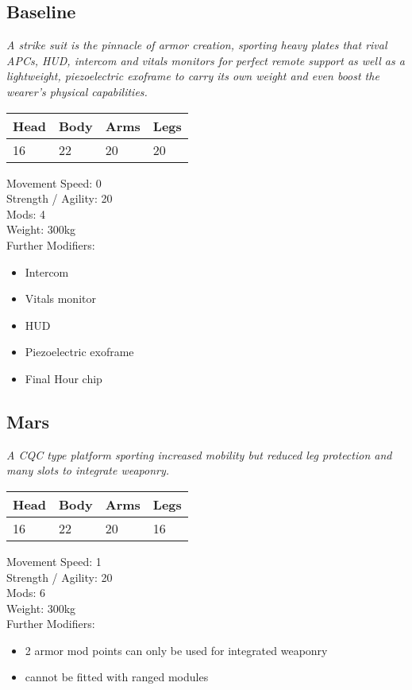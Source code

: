 \documentclass[12pt,a4paper,openany]{book}
\begin{document}
	\begin{multicols}{2}
	\subsection{Baseline}
	\textit{A strike suit is the pinnacle of armor creation, sporting heavy plates that rival APCs, HUD, intercom and vitals monitors for perfect remote support as well as a lightweight, piezoelectric exoframe to carry its own weight and even boost the wearer's physical capabilities.}\par
	\begin{tabular}{|l|l|l|l|}
		\hline
		Head & Body & Arms & Legs\\
		\hline
		16 & 22 & 20 & 20\\
		\hline
	\end{tabular}
	\par
	Movement Speed: 0\\
	Strength / Agility: 20\\
	Mods: 4\\
	Weight: 300kg\\
	Further Modifiers:
	\vspace{-8mm}
	\begin{itemize}
		\setlength\itemsep{-8mm}
		\item Intercom
		\item Vitals monitor
		\item HUD
		\item Piezoelectric exoframe
		\item Final Hour chip
	\end{itemize}
	\par
	\subsection{Mars}
	\textit{A CQC type platform sporting increased mobility but reduced leg protection and many slots to integrate weaponry.}\par
	\begin{tabular}{|l|l|l|l|}
		\hline
		Head & Body & Arms & Legs\\
		\hline
		16 & 22 & 20 & 16\\
		\hline
	\end{tabular}
	\par
	Movement Speed: 1\\
	Strength / Agility: 20\\
	Mods: 6\\
	Weight: 300kg\\
	Further Modifiers:
	\vspace{-8mm}
	\begin{itemize}
		\setlength\itemsep{-8mm}
		\item 2 armor mod points can only be used for integrated weaponry
		\item cannot be fitted with ranged modules
	\end{itemize}
	\par

\end{multicols}
\end{document}
